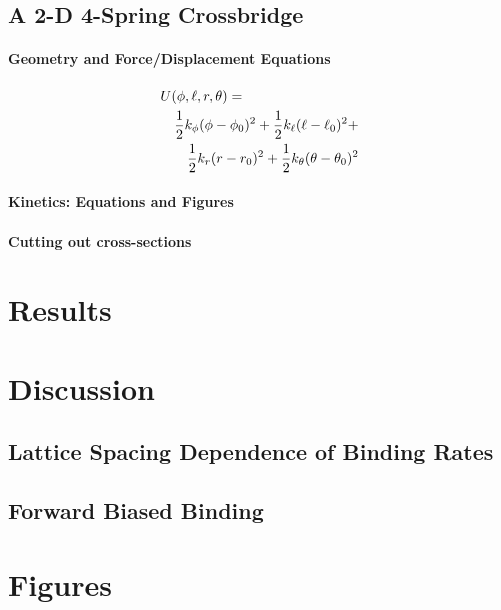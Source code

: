 \documentclass[]{article}
\begin{document}
\subsection*{A 2-D 4-Spring Crossbridge}


\paragraph*{Geometry and Force/Displacement Equations}


\begin{eqnarray}
	\lefteqn{U(\phi,\ell,r,\theta) = }  \nonumber \\
 	& & \frac{1}{2}k_\phi (\phi-\phi_0)^2 + \frac{1}{2}k_\ell (\ell-\ell_0)^2 + \nonumber \\
	& & \frac{1}{2}k_r (r-r_0)^2 + \frac{1}{2}k_\theta (\theta-\theta_0)^2
\end{eqnarray}

\paragraph*{Kinetics: Equations and Figures}
\paragraph*{Cutting out cross-sections}



\section*{Results}




\section*{Discussion}



\subsection*{Lattice Spacing Dependence of Binding Rates}




\subsection*{Forward Biased Binding}


\section*{Figures}
\end{document}
